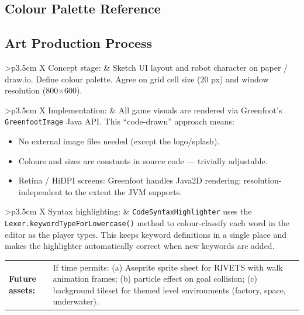 \documentclass[12pt,a4paper]{article}
\newcommand{\gddfield}[2]{%
  \noindent\begin{tabularx}{\linewidth}{>{\bfseries\color{accent}\sffamily}p{3.5cm} X}
    #1 & #2
  \end{tabularx}\smallskip}
\begin{document}
\subsection{Colour Palette Reference}

\begin{center}
\end{center}

\subsection{Art Production Process}

\begin{tcolorbox}[gddbox, title={Art Process}]
\gddfield{Concept stage:}{Sketch UI layout and robot character on paper / draw.io. Define colour palette. Agree on grid cell size (20 px) and window resolution (800$\times$600).}
\gddfield{Implementation:}{All game visuals are rendered via Greenfoot's \texttt{GreenfootImage} Java API. This ``code-drawn'' approach means:
\begin{itemize}[noitemsep]
  \item No external image files needed (except the logo/splash).
  \item Colours and sizes are constants in source code — trivially adjustable.
  \item Retina / HiDPI screens: Greenfoot handles Java2D rendering; resolution-independent to the extent the JVM supports.
\end{itemize}
}
\gddfield{Syntax highlighting:}{\texttt{CodeSyntaxHighlighter} uses the \texttt{Lexer.keywordTypeForLowercase()} method to colour-classify each word in the editor as the player types. This keeps keyword definitions in a single place and makes the highlighter automatically correct when new keywords are added.}
\gddfield{Future assets:}{If time permits: (a) Aseprite sprite sheet for RIVETS with walk animation frames; (b) particle effect on goal collision; (c) background tileset for themed level environments (factory, space, underwater).}
\end{tcolorbox}
\end{document}
